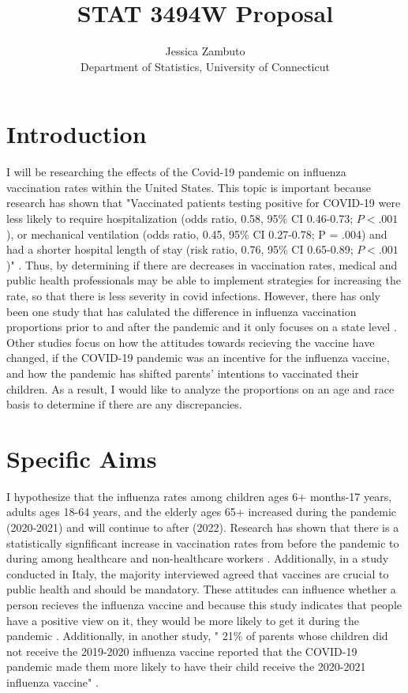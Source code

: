 \documentclass[12pt]{article}
\title{STAT 3494W Proposal}
\author{Jessica Zambuto\\
Department of Statistics, University of Connecticut}
\begin{document}
\maketitle

\section*{Introduction}
\label{sec:intro}
I will be researching the effects of the Covid-19 pandemic on influenza vaccination rates within the United States. This topic
is important because research has shown that "Vaccinated patients testing positive for COVID-19 were less likely to require hospitalization 
(odds ratio, 0.58, 95\% CI 0.46-0.73; $P< .001$), or mechanical ventilation (odds ratio, 0.45, 95\% CI 0.27-0.78; P = .004) and had a shorter 
hospital length of stay (risk ratio, 0.76, 95\% CI 0.65-0.89; $P< .001$)" \citep{conlon2021impact}. Thus, by determining if there are decreases
in vaccination rates, medical and public health professionals may be able to implement strategies for increasing the rate, so that there is less 
severity in covid infections. However, there has only been one study that has calulated the difference in influenza vaccination proportions prior 
to and after the pandemic and it only focuses on a state level \citep{leuchter2022association}. Other studies focus on how the attitudes towards
recieving the vaccine have changed, if the COVID-19 pandemic was an incentive for the influenza vaccine, and how the pandemic has shifted parents' 
intentions to vaccinated their children. As a result, I would like to analyze the proportions on an age and race basis to determine if there are 
any discrepancies. 

\section*{Specific Aims}
\label{sec:aims}
I hypothesize that the influenza rates among children ages 6+ months-17 years, adults ages 18-64 years, and the elderly ages 65+ increased during 
the pandemic (2020-2021) and will continue to after (2022). Research has shown that there is a statistically signfificant increase in vaccination 
rates from before the pandemic to during among healthcare and non-healthcare workers \citep{conlon2021impact}. Additionally, in a study conducted 
in Italy, the majority interviewed agreed that vaccines are crucial to public health and should be mandatory. These attitudes can influence whether
a person recieves the influenza vaccine and because this study indicates that people have a positive view on it, they would be more likely to 
get it during the pandemic \citep{domnich2020attitudes}. Additionally, in another study, " 21\% of parents whose children did not receive the 2019-2020 
influenza vaccine reported that the COVID-19 pandemic made them more likely to have their child receive the 2020-2021 influenza vaccine" \citep{sokol2020covid}.
\end{document}
